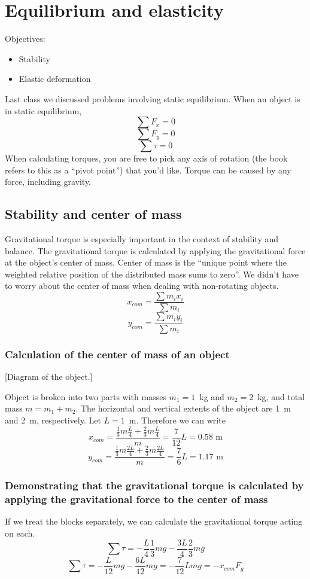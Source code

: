 \section{Equilibrium and elasticity}
Objectives:
\begin{itemize}
\item Stability
\item Elastic deformation
\end{itemize}

Last class we discussed problems involving static equilibrium. When an object is in static equilibrium,
$$\sum F_x=0$$
$$\sum F_y=0$$
$$\sum \tau=0$$
When calculating torques, you are free to pick any axis of rotation (the book refers to this as a ``pivot point'') that you'd like. Torque can be caused by any force, including gravity. 

\subsection{Stability and center of mass}
Gravitational torque is especially important in the context of stability and balance. The gravitational torque is calculated by applying the gravitational force at the object's center of mass. Center of mass is the ``unique point where the weighted relative position of the distributed mass sums to zero''. We didn't have to worry about the center of mass when dealing with non-rotating objects.
$$x_{com} = \frac{\sum m_ix_i}{\sum m_i}$$
$$y_{com} = \frac{\sum m_iy_i}{\sum m_i}$$

\subsubsection*{Calculation of the center of mass of an object}
[Diagram of the object.]
\vspace{4cm}

Object is broken into two parts with masses $m_1=1$~kg and $m_2=2$~kg, and total mass $m=m_1+m_2$. The horizontal and vertical extents of the object are 1~m and 2~m, respectively. Let $L=1$~m. Therefore we can write
$$x_{com} = \frac{\frac{1}{3}m\frac{L}{4} + \frac{2}{3}m\frac{L}{4}}{m} = \frac{7}{12}L = 0.58\mbox{ m}$$
$$y_{com} = \frac{\frac{1}{3}m\frac{2L}{4} + \frac{2}{3}m\frac{2L}{4}}{m} = \frac{7}{6}L = 1.17\mbox{ m}$$



\subsubsection*{Demonstrating that the gravitational torque is calculated by applying the gravitational force to the center of mass}
If we treat the blocks separately, we can calculate the gravitational torque acting on each.
$$\sum \tau = -\frac{L}{4}\frac{1}{3}mg - \frac{3L}{4}\frac{2}{3}mg$$
$$\sum \tau = -\frac{L}{12}mg - \frac{6L}{12}mg = -\frac{7}{12}Lmg = -x_{com}F_g$$

